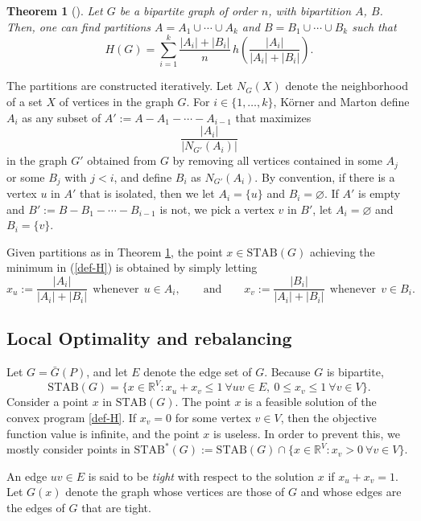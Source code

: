 \documentclass{article} \usepackage{fullpage}
\newtheorem{theorem}{Theorem}
\newcommand{\STAB}{\mathrm{STAB}}
\begin{document}
\begin{theorem}[\cite{KM88}]
\label{thm:KM}
Let $G$ be a bipartite graph of order $n$, with bipartition $A$, $B$. Then, one can find partitions $A = A_1 \cup \cdots \cup A_k$ and $B = B_1 \cup \cdots \cup B_k$ such that
$$
H(G) = \sum_{i=1}^k \frac{|A_i| + |B_i|}{n} \, h\left(\frac{|A_i|}{|A_i| + |B_i|}\right).
$$
\end{theorem}

The partitions are constructed iteratively. Let $N_G(X)$ denote the neighborhood of a set $X$ of vertices in the graph $G$. For $i \in \{1,\ldots,k\}$, K\"orner and Marton define $A_i$ as any subset of $A' := A - A_1 - \cdots - A_{i-1}$ that maximizes
\begin{equation}
\label{eq:bip_ratio}
\frac{|A_i|}{|N_{G'}(A_i)|}
\end{equation}
in the graph $G'$ obtained from $G$ by removing all vertices contained in some $A_j$ or some $B_j$ with $j < i$, and define $B_i$ as $N_{G'}(A_i)$. By convention, if there is a vertex $u$ in $A'$ that is isolated, then we let $A_i = \{u\}$ and $B_i = \varnothing$. If $A'$ is empty and $B' := B - B_1 - \cdots - B_{i-1}$ is not, we pick a vertex $v$ in $B'$, let $A_i = \varnothing$ and $B_i = \{v\}$.

Given partitions as in Theorem \ref{thm:KM}, the point $x \in \STAB(G)$ achieving the minimum in (\ref{def-H}) is obtained by simply letting
$$
x_u := \frac{|A_i|}{|A_i| + |B_i|}\ \ \text{whenever}\ \ u \in A_{i},
\qquad \text{and} \qquad
x_v := \frac{|B_i|}{|A_i| + |B_i|}\ \ \text{whenever}\ \ v \in B_{i}.
$$

\subsection{Local Optimality and rebalancing}
\label{sec:locimp}

Let $G = \bar{G}(P)$, and let $E$ denote the edge set of $G$. Because $G$ is bipartite, 
$$
\STAB(G) = \{x \in \mathbb{R}^V : x_u + x_v \leq 1\ \forall uv \in E,\ 0 \leq x_v \leq 1\ \forall v \in V\}.
$$
Consider a point $x$ in $\STAB(G)$. The point $x$ is a feasible solution of the convex program \eqref{def-H}. If $x_v = 0$ for some vertex $v \in V$, then the objective function value is infinite, and the point $x$ is useless. In order to prevent this, we mostly consider points in $\STAB^*(G) := \STAB(G) \cap \{x \in \mathbb{R}^V : x_v > 0\ \forall v \in V\}$. 

An edge $uv \in E$ is said to be {\sl tight\/} with respect to the solution $x$ if $x_{u} + x_{v}=1$. Let $G(x)$ denote the graph whose vertices are those of $G$ and whose edges are the edges of $G$ that are tight.
\end{document}
